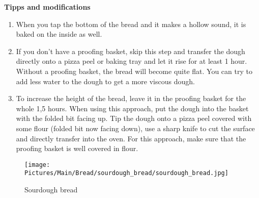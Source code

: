 \textbf{Tipps and modifications}\\
\begin{enumerate}
  \item When you tap the bottom of the bread and it makes a hollow sound, it is baked on the inside as well.
  \item If you don't have a proofing basket, skip this step and transfer the dough directly onto a pizza peel or baking tray and let it rise for at least 1 hour. Without a proofing basket, the bread will become quite flat. You can try to add less water to the dough to get a more viscous dough.
  \item To increase the height of the bread, leave it in the proofing basket for the whole 1,5 hours. When using this approach, put the dough into the basket with the folded bit facing up. Tip the dough onto a pizza peel covered with some flour (folded bit now facing down), use a sharp knife to cut the surface and directly transfer into the oven. For this approach, make sure that the proofing basket is well covered in flour.
\end{enumerate}

\begin{figure}[!htb]
    \begin{center}
    \texttt{[image: Pictures/Main/Bread/sourdough\_bread/sourdough\_bread.jpg]}
    \caption[Sourdough bread]{Sourdough bread}
    \label{fig:reibeplaetzchen}
    \end{center}
\end{figure}